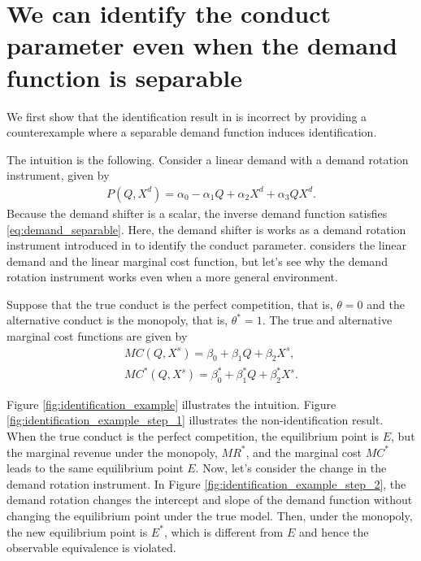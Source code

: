 \documentclass[11pt, a4paper]{article}
\theoremstyle{remark}
\begin{document}
\section{We can identify the conduct parameter even when the demand function is separable}\label{sec:identification_example}

We first show that the identification result in \citet{lau1982identifying} is incorrect by providing a counterexample where a separable demand function induces identification.

The intuition is the following.
Consider a linear demand with a demand rotation instrument, given by
\begin{align}
    P(Q, X^{d}) = \alpha_0 - \alpha_1Q + \alpha_2X^{d} + \alpha_3QX^{d}. \label{eq:demand_counterexample}
\end{align}
Because the demand shifter is a scalar, the inverse demand function satisfies \eqref{eq:demand_separable}.
Here, the demand shifter is works as a demand rotation instrument introduced in \citet{bresnahan1982oligopoly} to identify the conduct parameter.
\citet{bresnahan1982oligopoly} considers the linear demand and the linear marginal cost function, but let's see why the demand rotation instrument works even when a more general environment.


Suppose that the true conduct is the perfect competition, that is, $\theta = 0$ and the alternative conduct is the monopoly, that is, $\theta^{*} = 1$.
The true and alternative marginal cost functions are given by
\begin{align}
    MC(Q, X^{s}) = \beta_0 + \beta_1Q + \beta_2X^{s}, \label{eq:mc_true}\\
    MC^{*}(Q, X^{s}) = \beta_0^{*} + \beta_1^{*}Q + \beta_2^{*}X^{s}. \label{eq:mc_alternative}
\end{align}

Figure \ref{fig:identification_example} illustrates the intuition.
Figure \ref{fig:identification_example_step_1} illustrates the non-identification result.
When the true conduct is the perfect competition, the equilibrium point is $E$, but the marginal revenue under the monopoly, $MR^{*}$, and the marginal cost $MC^{*}$ leads to the same equilibrium point $E$.
Now, let's consider the change in the demand rotation instrument.
In Figure \ref{fig:identification_example_step_2}, the demand rotation changes the intercept and slope of the demand function without changing the equilibrium point under the true model.
Then, under the monopoly, the new equilibrium point is $E^{*}$, which is different from $E$ and hence the observable equivalence is violated.
\end{document}
